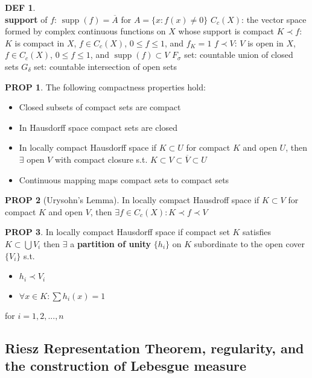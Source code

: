 \documentclass[hidelinks,10pt]{article}
\theoremstyle{definition}
\newtheorem*{defin}{DEF}
\theoremstyle{dotles}
\theoremstyle{dotless}
\newtheorem{proposition}{PROP}[section]
\theoremstyle{remark}
\DeclareMathOperator\supp{supp}
\begin{document}
\begin{defin}~\\
\textbf{support} of $f$: $\supp(f)=\overline{A}$ for $A=\{x:f(x)\neq0\}$\newline
$C_c(X)$: the vector space formed by complex continuous functions on $X$ whose support is compact\bigbreak
$K\prec f$: $K$ is compact in $X$, $f\in C_c(X)$, $0\leq f\leq1$, and $f_K=1$\newline
$f\prec V$: $V$ is open in $X$, $f\in C_c(X)$, $0\leq f\leq1$, and $\supp(f)\subset V$\bigbreak
$F_\sigma$ set: countable union of closed sets\newline
$G_\delta$ set: countable intersection of open sets
\end{defin}

\begin{proposition}The following compactness properties hold:
\begin{itemize}
    \item Closed subsets of compact sets are compact
    \item In Hausdorff space compact sets are closed
    \item In locally compact Hausdorff space if $K\subset U$ for compact $K$ and open $U$, then $\exists$ open $V$ with compact closure s.t. $K\subset V\subset\overline{V}\subset U$
    \item Continuous mapping maps compact sets to compact sets
\end{itemize}
\end{proposition}

\begin{proposition}[Urysohn's Lemma] In locally compact Hausdroff space if $K\subset V$ for compact $K$ and open $V$, then $\exists f\in C_c(X):K\prec f\prec V$
\end{proposition}

\begin{proposition}In locally compact Hausdorff space if compact set $K$ satisfies $K\subset\bigcup V_i$ then $\exists$ a \textbf{partition of unity} $\{h_i\}$ on $K$ subordinate to the open cover $\{V_i\}$ s.t.\begin{itemize}
    \item $h_i\prec V_i$
    \item $\forall x\in K:\sum h_i(x)=1$
\end{itemize}
for $i=1,2,...,n$
\end{proposition}

\subsection{Riesz Representation Theorem, regularity, and the construction of Lebesgue measure}
\end{document}
